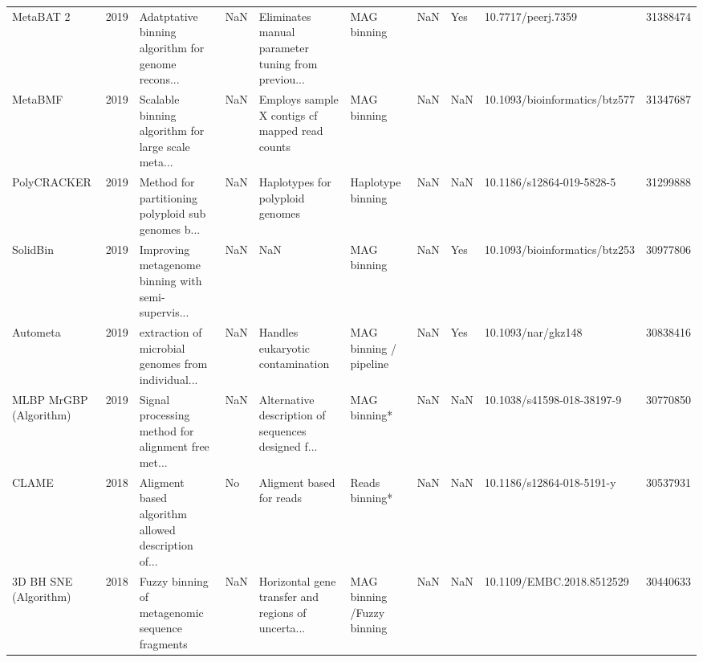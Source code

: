 \begin{tabular}{lrlllllllr}
                 MetaBAT 2 &  2019 & Adatptative binning algorithm for genome recons... &            NaN & Eliminates manual parameter tuning from previou... &                               MAG binning &                                            NaN &                        Yes &             10.7717/peerj.7359 &  31388474 \\
                   MetaBMF &  2019 & Scalable binning algorithm for large scale meta... &            NaN &     Employs sample X contigs cf mapped read counts &                               MAG binning &                                            NaN &                        NaN &  10.1093/bioinformatics/btz577 &  31347687 \\
               PolyCRACKER &  2019 & Method for partitioning polyploid sub genomes b... &            NaN &                   Haplotypes for polyploid genomes &                         Haplotype binning &                                            NaN &                        NaN &      10.1186/s12864-019-5828-5 &  31299888 \\
                  SolidBin &  2019 & Improving metagenome binning with semi-supervis... &            NaN &                                                NaN &                               MAG binning &                                            NaN &                        Yes &  10.1093/bioinformatics/btz253 &  30977806 \\
                  Autometa &  2019 & extraction of microbial genomes from individual... &            NaN &                   Handles eukaryotic contamination &                    MAG binning / pipeline &                                            NaN &                        Yes &             10.1093/nar/gkz148 &  30838416 \\
    MLBP MrGBP (Algorithm) &  2019 & Signal processing method for alignment free met... &            NaN & Alternative description of sequences designed f... &                              MAG binning* &                                            NaN &                        NaN &     10.1038/s41598-018-38197-9 &  30770850 \\
                     CLAME &  2018 & Aligment based algorithm allowed description of... &             No &                          Aligment  based for reads &                            Reads binning* &                                            NaN &                        NaN &      10.1186/s12864-018-5191-y &  30537931 \\
     3D BH SNE (Algorithm) &  2018 &    Fuzzy binning of metagenomic sequence fragments &            NaN & Horizontal gene transfer and regions of uncerta... &                MAG binning /Fuzzy binning &                                            NaN &                        NaN &      10.1109/EMBC.2018.8512529 &  30440633 \\

\end{tabular}
